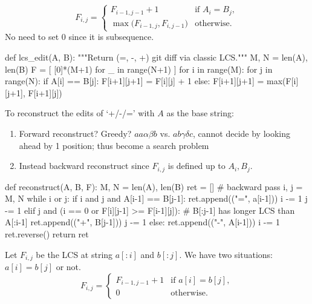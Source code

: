 \[
F_{i, j} = 
\begin{cases}
  F_{i-1, j-1}+1 & \text{if } A_i=B_j, \\
  \max\Big(F_{i-1, j}, F_{i,j-1}\Big) & \text{otherwise}.
\end{cases}
\]
No need to set 0 since it is subsequence. 
\begin{center}
\end{center}

\begin{python}
def lcs_edit(A, B):
    """Return (=, -, +) git diff via classic LCS."""
    M, N = len(A), len(B)
    F = [
        [0]*(M+1) 
        for _ in range(N+1)
    ]
    for i in range(M):
        for j in range(N):
            if A[i] == B[j]:
                F[i+1][j+1] = F[i][j] + 1  
            else:
                F[i+1][j+1] = max(F[i][j+1], F[i+1][j])
\end{python}

To reconstruct the edits of `+/-/=' with $A$ as the base string:
\begin{enumerate}
\item Forward reconstruct? Greedy? $aa\alpha\beta b$ vs. $ab\gamma \delta c$, cannot decide by looking ahead by 1 position; thus become a search problem
\item Instead backward reconstruct since $F_{i, j}$ is defined up to $A_i, B_j$.
\end{enumerate}
\begin{python}
def reconstruct(A, B, F):
    M, N = len(A), len(B)
    ret = []
    # backward pass
    i, j = M, N
    while i or j:
        if i and j and A[i-1] == B[j-1]:
            ret.append(("=", a[i-1]))
            i -= 1
            j -= 1
        elif j and (i == 0 or F[i][j-1] >= F[i-1][j]):
            # B[:j-1] has longer LCS than A[:i-1]
            ret.append(("+", B[j-1]))
            j -= 1
        else:
            ret.append(("-", A[i-1]))
            i -= 1
    ret.reverse()
    return ret
\end{python}
 Let $F_{i, j}$ be the LCS at string $a[:i]$ and
$b[:j]$. We have two situations: $a[i]=b[j]$ or not.
\[
F_{i, j} = 
\begin{cases}
  F_{i-1, j-1}+1 & \text{if } a[i]=b[j], \\
  0 & \text{otherwise}.
\end{cases}
\]


